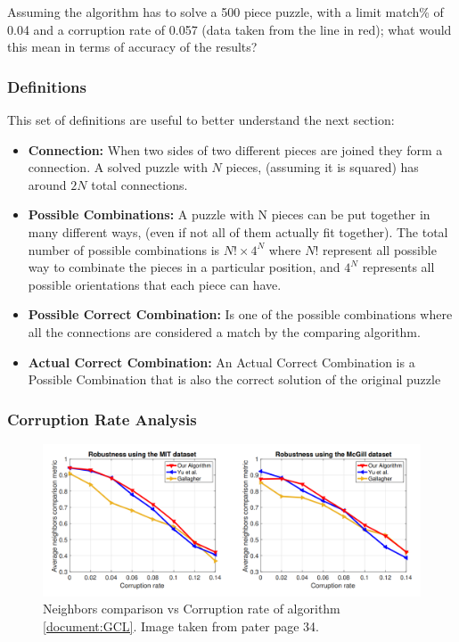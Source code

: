 \documentclass{article}
\begin{document}
Assuming the algorithm has to solve a 500 piece puzzle, with a limit match\% of 0.04
and a corruption rate of 0.057 (data taken from the line in red);
what would this mean in terms of accuracy of the results?

\subsubsection{Definitions}
This set of definitions are useful to better understand the next section:

\begin{itemize}
  \item \textbf{Connection:}\newline
  When two sides of two different pieces are joined they form a connection.
  A solved puzzle with \(N\) pieces, (assuming it is squared) has around \(2N\) total connections.

  \item \textbf{Possible Combinations:}\newline
  A puzzle with N pieces can be put together in many different ways,
  (even if not all of 	them actually fit together).
  The total number of possible combinations is \(N! \times 4^N\) where
  \(N!\) represent all possible way to combinate the pieces in a particular position, and
  \(4^N\) represents all possible orientations that each piece can have.
  \item \textbf{Possible Correct Combination:}\newline
  Is one of the possible combinations where all the connections are considered a match
  by the comparing algorithm.
  \item \textbf{Actual Correct Combination:}\newline
  An Actual Correct Combination is a Possible Combination that
  is also the correct solution of the original puzzle	
\end{itemize}

\subsubsection{Corruption Rate Analysis}
\begin{figure}[h]
  \caption{Neighbors comparison vs Corruption rate of algorithm \ref{document:GCL}. Image taken from pater \cite{GCL} page 34.}\label{fig:GCL_Corruption_Rate}
  \centering
  \includegraphics[height=0.35\textwidth]{pictures/corruption_rate.png}
\end{figure}
\end{document}
